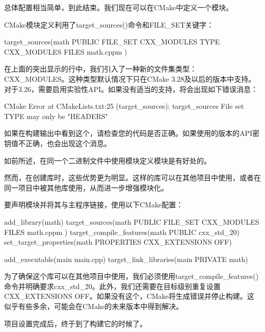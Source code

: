 总体配置相当简单，到此结束。我们现在可以在CMake中定义一个模块。


CMake模块定义利用了target\_sources()命令和FILE\_SET关键字：

\begin{cmake}
target_sources(math
    PUBLIC FILE_SET CXX_MODULES TYPE CXX_MODULES FILES math.cppm
)
\end{cmake}

在上面的突出显示的行中，我们引入了一种新的文件集类型：CXX\_MODULES。这种类型默认情况下只在CMake 3.28及以后的版本中支持。对于3.26，需要启用实验性API。如果没有适当的支持，将会出现如下错误消息：

\begin{shell}
CMake Error at CMakeLists.txt:25 (target_sources):
target_sources File set TYPE may only be "HEADERS"
\end{shell}

如果在构建输出中看到这个，请检查您的代码是否正确。如果使用的版本的API密钥值不正确，也会出现这个消息。

如前所述，在同一个二进制文件中使用模块定义模块是有好处的。

然而，在创建库时，这些优势更为明显。这样的库可以在其他项目中使用，或者在同一项目中被其他库使用，从而进一步增强模块化。

要声明模块并将其与主程序链接，使用以下CMake配置：


\begin{cmake}
add_library(math)
target_sources(math
    PUBLIC FILE_SET CXX_MODULES FILES math.cppm
)
target_compile_features(math PUBLIC cxx_std_20)
set_target_properties(math PROPERTIES CXX_EXTENSIONS OFF)

add_executable(main main.cpp)
target_link_libraries(main PRIVATE math)
\end{cmake}

为了确保这个库可以在其他项目中使用，我们必须使用target\_compile\_features()命令并明确要求cxx\_std\_20。此外，我们还需要在目标级别重复设置CXX\_EXTENSIONS OFF。如果没有这个，CMake将生成错误并停止构建。这似乎有些多余，可能会在CMake的未来版本中得到解决。

项目设置完成后，终于到了构建它的时候了。
